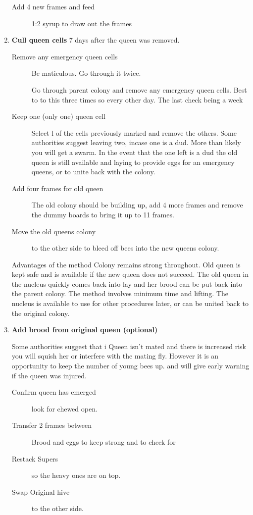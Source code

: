 \begin{enumerate}
\begin{description}
  \item[Add 4 new frames and feed] 1:2 syrup to draw out the frames

 \end{description}
 
 
\item \textbf{Cull queen cells}
7 days after the queen was removed.

\begin{description}
  \item[Remove any emergency queen cells] Be maticulous.  Go through it twice.
  
  
Go through parent colony and remove any emergency queen cells.  Best to to this three times so every other day.  The last check being a week

  \item[Keep one (only one) queen cell]
Select l of the cells previously marked and remove the others.
Some authorities suggest leaving two, incase one is a dud.
More than likely you will get a swarm.
In the event that the one left is a dud the old queen is still available and laying to provide eggs for an emergency queens,
or to unite back with the colony.

  \item[Add four frames for old queen] The old colony should be building up, add 4 more frames and remove the dummy boards to bring it up to 11 frames.
  \item[Move the old queens colony] to the other side to bleed off bees into the new queens colony.
\end{description}

Advantages of the method
Colony remains strong throughout.
Old queen is kept safe and is available if the new queen does not succeed.
The old queen in the nucleus quickly comes back into lay and her brood can be put back into the parent colony.
The method involves minimum time and lifting.
The nucleus is available to use for other procedures later, or can be united back to the original colony.

\item \textbf{Add brood from original queen (optional)}

Some authorities suggest that i
Queen isn't mated and there is increased risk you will squish her or interfere with the mating fly.
However it is an opportunity to keep the number of young bees up.
and will give early warning if the queen was injured.

\begin{description}
  \item[Confirm queen has emerged] look for chewed open.
  \item[Transfer 2 frames between] Brood and eggs to keep strong and to check for
  \item[Restack Supers] so the heavy ones are on top.
  \item[Swap Original hive] to the other side.
\end{description}


\end{enumerate}

